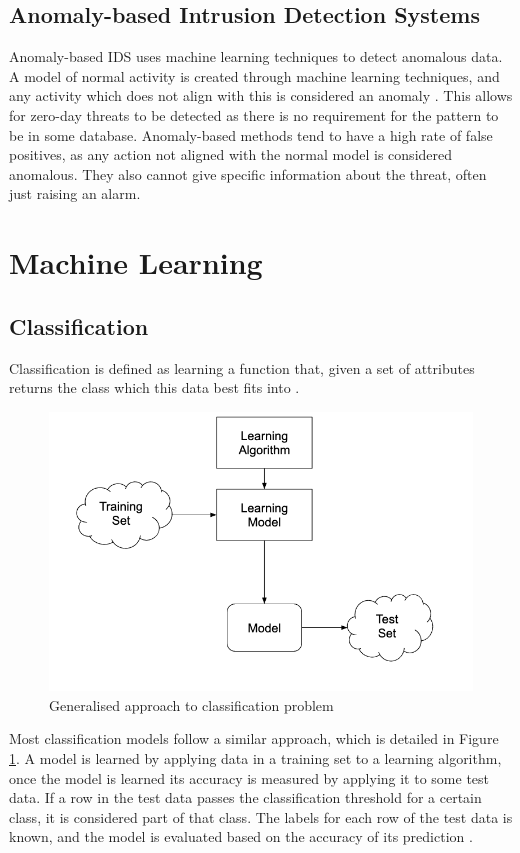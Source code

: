 \subsection{Anomaly-based Intrusion Detection Systems}
Anomaly-based IDS uses machine learning techniques to detect anomalous data. A model of normal activity is created through machine learning techniques, and any activity which does not align with this is considered an anomaly \cite{Khraisat2019}. This allows for zero-day threats to be detected as there is no requirement for the pattern to be in some database. Anomaly-based methods tend to have a high rate of false positives, as any action not aligned with the normal model is considered anomalous. They also cannot give specific information about the threat, often just raising an alarm.

\section{Machine Learning}
\subsection{Classification}
Classification is defined as learning a function that, given a set of attributes returns the class which this data best fits into \cite{I2DM}.
\begin{figure}[H]
\centering
\includegraphics[scale = 0.3]{Images/classification.png}
 \caption{Generalised approach to classification problem}
 \label{fig:class}
\end{figure}
Most classification models follow a similar approach, which is detailed in Figure \ref{fig:class}. A model is learned by applying data in a training set to a learning algorithm, once the model is learned its accuracy is measured by applying it to some test data. If a row in the test data passes the classification threshold for a certain class, it is considered part of that class. The labels for each row of the test data is known, and the model is evaluated based on the accuracy of its prediction \cite{I2DM}.

